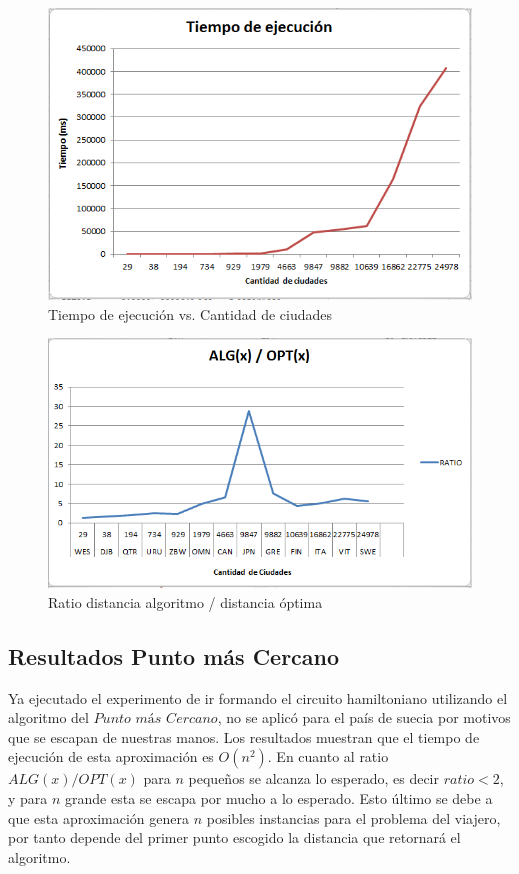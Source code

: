 \documentclass[12pt,letterpaper, margin = 3cm]{article}
\begin{document}
 \begin{figure}[ht!]
 \centering
 \includegraphics[scale=0.8]{img/timeconvexH.png}
 \caption{Tiempo de ejecución vs. Cantidad de ciudades}
 \end{figure}
 \begin{figure}[ht!]
 \centering
 \includegraphics[scale=0.8]{img/ratioconvexH.png}
 \caption{Ratio distancia algoritmo / distancia óptima}
 \end{figure}

\newpage 
\subsection{Resultados Punto más Cercano}

Ya ejecutado el experimento de ir formando el circuito hamiltoniano utilizando el algoritmo del $Punto$ $más$ $Cercano$, no se aplicó para el país de suecia por motivos que se escapan de nuestras manos. Los resultados muestran que el tiempo de ejecución de esta aproximación es $O(n^2)$. En cuanto al ratio $ALG(x)/OPT(x)$ para $n$ pequeños se alcanza lo esperado, es decir $ratio<2$, y para $n$ grande esta se escapa por mucho a lo esperado. Esto último se debe a que esta aproximación genera $n$ posibles instancias para el problema del viajero, por tanto depende del primer punto escogido la distancia que retornará el algoritmo.
\end{document}
